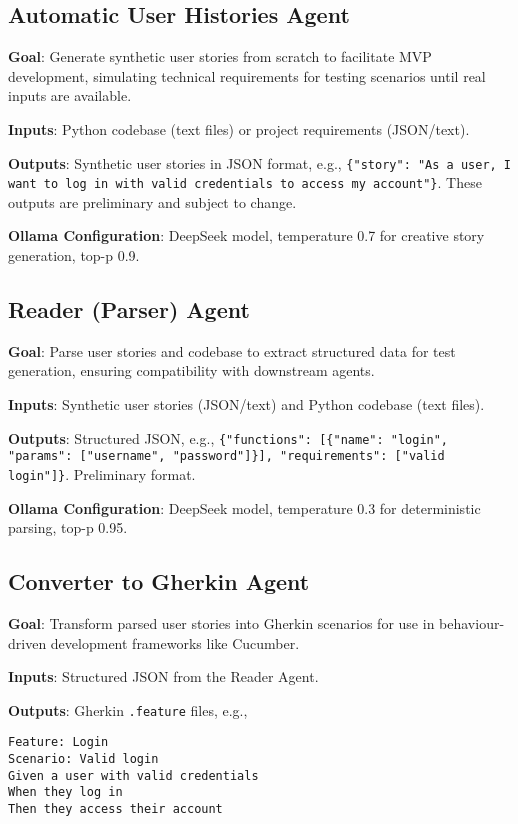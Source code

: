 \documentclass{article}
\begin{document}
\subsection{Automatic User Histories Agent}
\textbf{Goal}: Generate synthetic user stories from scratch to facilitate MVP development, simulating technical requirements for testing scenarios until real inputs are available.

\textbf{Inputs}: Python codebase (text files) or project requirements (JSON/text).

\textbf{Outputs}: Synthetic user stories in JSON format, e.g., \texttt{\{"story": "As a user, I want to log in with valid credentials to access my account"\}}. These outputs are preliminary and subject to change.

\textbf{Ollama Configuration}: DeepSeek model, temperature 0.7 for creative story generation, top-p 0.9.

\subsection{Reader (Parser) Agent}
\textbf{Goal}: Parse user stories and codebase to extract structured data for test generation, ensuring compatibility with downstream agents.

\textbf{Inputs}: Synthetic user stories (JSON/text) and Python codebase (text files).

\textbf{Outputs}: Structured JSON, e.g., \texttt{\{"functions": [\{"name": "login", "params": ["username", "password"]\}], "requirements": ["valid login"]\}}. Preliminary format.

\textbf{Ollama Configuration}: DeepSeek model, temperature 0.3 for deterministic parsing, top-p 0.95.

\subsection{Converter to Gherkin Agent}
\textbf{Goal}: Transform parsed user stories into Gherkin scenarios for use in behaviour-driven development frameworks like Cucumber.

\textbf{Inputs}: Structured JSON from the Reader Agent.

\textbf{Outputs}: Gherkin \texttt{.feature} files, e.g.,

\begin{verbatim}
Feature: Login
Scenario: Valid login
Given a user with valid credentials
When they log in
Then they access their account
\end{verbatim}
\end{document}
